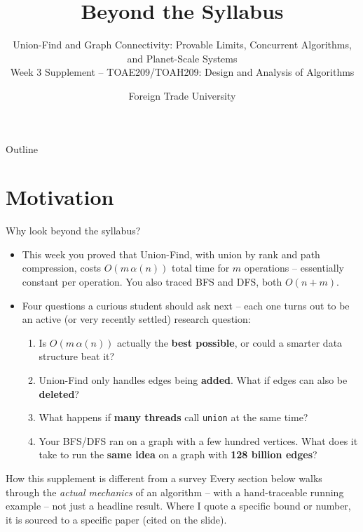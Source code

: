 \documentclass[11pt,aspectratio=169]{beamer}
\title{Beyond the Syllabus}
\subtitle{Union-Find and Graph Connectivity: Provable Limits, Concurrent Algorithms,
and Planet-Scale Systems\\
\small Week 3 Supplement -- TOAE209/TOAH209: Design and Analysis of Algorithms}
\author{Foreign Trade University}
\date{}
\begin{document}
\begin{frame}
  \titlepage
\end{frame}

\begin{frame}{Outline}
  \tableofcontents
\end{frame}

\section{Motivation}

\begin{frame}{Why look beyond the syllabus?}
  \begin{itemize}
    \item This week you proved that Union-Find, with union by rank and path
    compression, costs $O(m\,\alpha(n))$ total time for $m$ operations -- essentially
    constant per operation. You also traced BFS and DFS, both $O(n+m)$.
    \item Four questions a curious student should ask next -- each one turns out to be
    an active (or very recently settled) research question:
    \begin{enumerate}
      \item Is $O(m\,\alpha(n))$ actually the \textbf{best possible}, or could a
      smarter data structure beat it?
      \item Union-Find only handles edges being \textbf{added}. What if edges can also
      be \textbf{deleted}?
      \item What happens if \textbf{many threads} call \texttt{union} at the same
      time?
      \item Your BFS/DFS ran on a graph with a few hundred vertices. What does it take
      to run the \textbf{same idea} on a graph with \textbf{128 billion edges}?
    \end{enumerate}
  \end{itemize}
  \begin{alertblock}{How this supplement is different from a survey}
    Every section below walks through the \emph{actual mechanics} of an algorithm --
    with a hand-traceable running example -- not just a headline result. Where I quote
    a specific bound or number, it is sourced to a specific paper (cited on the slide).
  \end{alertblock}
\end{frame}
\end{document}
